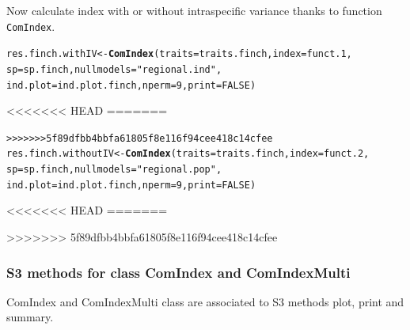 \documentclass[12pt]{article}\usepackage[]{graphicx}\usepackage[]{color}
\makeatletter
\newcommand{\hlnum}[1]{\textcolor[rgb]{0.686,0.059,0.569}{#1}}%
\newcommand{\hlstr}[1]{\textcolor[rgb]{0.192,0.494,0.8}{#1}}%
\newcommand{\hlstd}[1]{\textcolor[rgb]{0.345,0.345,0.345}{#1}}%
\newcommand{\hlkwb}[1]{\textcolor[rgb]{0.69,0.353,0.396}{#1}}%
\newcommand{\hlkwc}[1]{\textcolor[rgb]{0.333,0.667,0.333}{#1}}%
\newcommand{\hlkwd}[1]{\textcolor[rgb]{0.737,0.353,0.396}{\textbf{#1}}}%
\newenvironment{kframe}{%
 \def\at@end@of@kframe{}%
 \ifinner\ifhmode%
  \def\at@end@of@kframe{\end{minipage}}%
  \begin{minipage}{\columnwidth}%
 \fi\fi%
 \def\FrameCommand##1{\hskip\@totalleftmargin \hskip-\fboxsep
 \colorbox{shadecolor}{##1}\hskip-\fboxsep
     \hskip-\linewidth \hskip-\@totalleftmargin \hskip\columnwidth}%
 \MakeFramed {\advance\hsize-\width
   \@totalleftmargin\z@ \linewidth\hsize
   \@setminipage}}%
 {\par\unskip\endMakeFramed%
 \at@end@of@kframe}
\newenvironment{knitrout}{}{} %
\makeatother
\begin{document}
Now calculate index with or without intraspecific variance thanks to function \texttt{ComIndex}.
\begin{knitrout}
\color{fgcolor}\begin{kframe}
\begin{alltt}
\hlstd{res.finch.withIV}\hlkwb{<-}\hlkwd{ComIndex}\hlstd{(}\hlkwc{traits} \hlstd{= traits.finch,} \hlkwc{index} \hlstd{= funct.1,}
               \hlkwc{sp} \hlstd{= sp.finch,} \hlkwc{nullmodels} \hlstd{=} \hlstr{"regional.ind"}\hlstd{,}
               \hlkwc{ind.plot} \hlstd{= ind.plot.finch,} \hlkwc{nperm} \hlstd{=} \hlnum{9}\hlstd{,} \hlkwc{print} \hlstd{=} \hlnum{FALSE}\hlstd{)}
\end{alltt}


<<<<<<< HEAD
=======
{\ttfamily\noindent\bfseries{}}\begin{alltt}
>>>>>>> 5f89dfbb4bbfa61805f8e116f94cee418c14cfee
\hlstd{res.finch.withoutIV}\hlkwb{<-}\hlkwd{ComIndex}\hlstd{(}\hlkwc{traits} \hlstd{= traits.finch,} \hlkwc{index} \hlstd{= funct.2,}
               \hlkwc{sp} \hlstd{= sp.finch,} \hlkwc{nullmodels} \hlstd{=} \hlstr{"regional.pop"}\hlstd{,}
               \hlkwc{ind.plot} \hlstd{= ind.plot.finch,} \hlkwc{nperm} \hlstd{=} \hlnum{9}\hlstd{,} \hlkwc{print} \hlstd{=} \hlnum{FALSE}\hlstd{)}
\end{alltt}


<<<<<<< HEAD
=======
{\ttfamily\noindent\bfseries{}}\end{kframe}
\end{knitrout}


>>>>>>> 5f89dfbb4bbfa61805f8e116f94cee418c14cfee
\subsubsection{S3 methods for class ComIndex and ComIndexMulti}
ComIndex and ComIndexMulti class are associated to S3 methods plot, print and summary.
\end{document}
